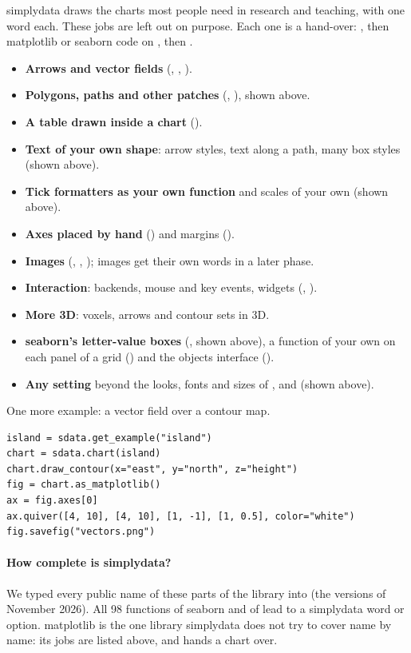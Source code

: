simplydata draws the charts most people need in research and teaching, with one word each. These jobs
are left out on purpose. Each one is a hand-over: , then
matplotlib or seaborn code on , then .
\begin{itemize}
  \item \textbf{Arrows and vector fields} (, , ).
  \item \textbf{Polygons, paths and other patches} (, ), shown above.
  \item \textbf{A table drawn inside a chart} ().
  \item \textbf{Text of your own shape}: arrow styles, text along a path, many box styles (shown above).
  \item \textbf{Tick formatters as your own function} and scales of your own (shown above).
  \item \textbf{Axes placed by hand} () and margins ().
  \item \textbf{Images} (, , ); images get their own words in
    a later phase.
  \item \textbf{Interaction}: backends, mouse and key events, widgets (, ).
  \item \textbf{More 3D}: voxels, arrows and contour sets in 3D.
  \item \textbf{seaborn's letter-value boxes} (, shown above), a function of your own on
    each panel of a grid () and the objects interface ().
  \item \textbf{Any  setting} beyond the looks, fonts and sizes of ,
     and  (shown above).
\end{itemize}

One more example: a vector field over a contour map.

\begin{lstlisting}[style=py]
island = sdata.get_example("island")
chart = sdata.chart(island)
chart.draw_contour(x="east", y="north", z="height")
fig = chart.as_matplotlib()
ax = fig.axes[0]
ax.quiver([4, 10], [4, 10], [1, -1], [1, 0.5], color="white")
fig.savefig("vectors.png")
\end{lstlisting}

\paragraph{How complete is simplydata?}
We typed every public name of these parts of the library into  (the versions of November 2026).
All 98 functions of seaborn and of  lead
to a simplydata word or option. matplotlib is the one library simplydata does not try to cover name by name: its
jobs are listed above, and  hands a chart over.
